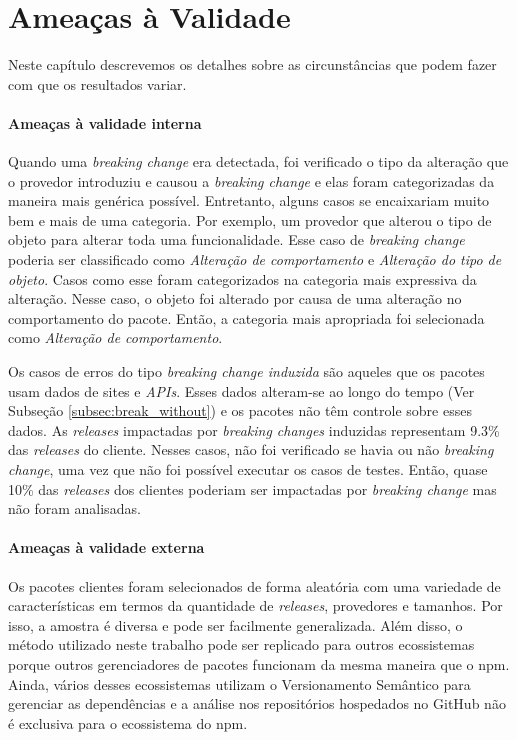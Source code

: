 \chapter{Ameaças à Validade}
\label{cap:threats}

Neste capítulo descrevemos os detalhes sobre as circunstâncias que podem fazer com que os resultados variar.

\subsubsection{Ameaças à validade interna}
Quando uma \textit{breaking change} era detectada, foi verificado o tipo da alteração que o provedor introduziu e causou a \textit{breaking change} e elas foram categorizadas da maneira mais genérica possível. Entretanto, alguns casos se encaixariam muito bem e mais de uma categoria. Por exemplo, um provedor que alterou o tipo de objeto para alterar toda uma funcionalidade. Esse caso de \textit{breaking change} poderia ser classificado como \textit{Alteração de comportamento} e \textit{Alteração do tipo de objeto}. Casos como esse foram categorizados na categoria mais expressiva da alteração. Nesse caso, o objeto foi alterado por causa de uma alteração no comportamento do pacote. Então, a categoria mais apropriada foi selecionada como \textit{Alteração de comportamento}.

Os casos de erros do tipo \textit{breaking change induzida} são aqueles que os pacotes usam dados de sites e \textit{APIs}. Esses dados alteram-se ao longo do tempo (Ver Subseção \ref{subsec:break_without}) e os pacotes não têm controle sobre esses dados. As \textit{releases} impactadas por \textit{breaking changes} induzidas representam 9.3\% das \textit{releases} do cliente. Nesses casos, não foi verificado se havia ou não \textit{breaking change}, uma vez que não foi possível executar os casos de testes. Então, quase 10\% das \textit{releases} dos clientes poderiam ser impactadas por \textit{breaking change} mas não foram analisadas.

\subsubsection{Ameaças à validade externa}
Os pacotes clientes foram selecionados de forma aleatória com uma variedade de características em termos da quantidade de \textit{releases}, provedores e tamanhos. Por isso, a amostra é diversa e pode ser facilmente generalizada. Além disso, o método utilizado neste trabalho pode ser replicado para outros ecossistemas porque outros gerenciadores de pacotes funcionam da mesma maneira que o \textsf{npm}. Ainda, vários desses ecossistemas utilizam o Versionamento Semântico para gerenciar as dependências e a análise nos repositórios hospedados no \textsf{GitHub} não é exclusiva para o ecossistema do \textsf{npm}.


